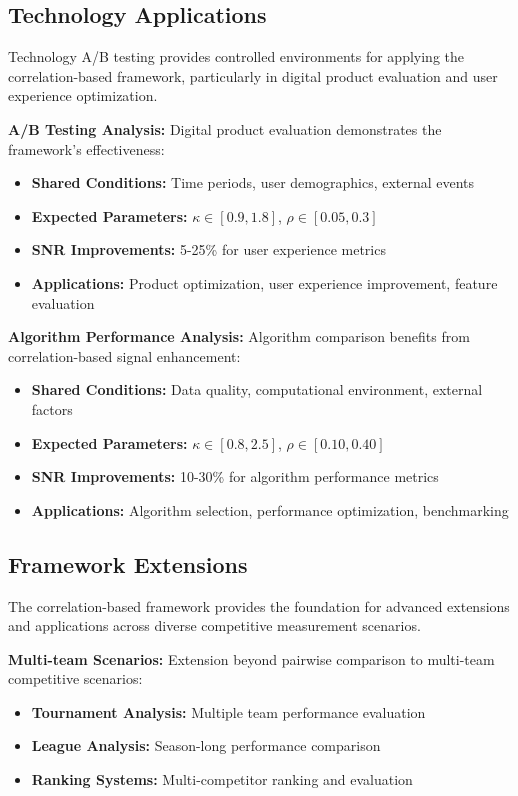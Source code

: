 \subsection{Technology Applications}

Technology A/B testing provides controlled environments for applying the correlation-based framework, particularly in digital product evaluation and user experience optimization.

\textbf{A/B Testing Analysis:}
Digital product evaluation demonstrates the framework's effectiveness:
\begin{itemize}
    \item \textbf{Shared Conditions:} Time periods, user demographics, external events
    \item \textbf{Expected Parameters:} $\kappa \in [0.9, 1.8]$, $\rho \in [0.05, 0.3]$
    \item \textbf{SNR Improvements:} 5-25\% for user experience metrics
    \item \textbf{Applications:} Product optimization, user experience improvement, feature evaluation
\end{itemize}

\textbf{Algorithm Performance Analysis:}
Algorithm comparison benefits from correlation-based signal enhancement:
\begin{itemize}
    \item \textbf{Shared Conditions:} Data quality, computational environment, external factors
    \item \textbf{Expected Parameters:} $\kappa \in [0.8, 2.5]$, $\rho \in [0.10, 0.40]$
    \item \textbf{SNR Improvements:} 10-30\% for algorithm performance metrics
    \item \textbf{Applications:} Algorithm selection, performance optimization, benchmarking
\end{itemize}

\subsection{Framework Extensions}

The correlation-based framework provides the foundation for advanced extensions and applications across diverse competitive measurement scenarios.

\textbf{Multi-team Scenarios:}
Extension beyond pairwise comparison to multi-team competitive scenarios:
\begin{itemize}
    \item \textbf{Tournament Analysis:} Multiple team performance evaluation
    \item \textbf{League Analysis:} Season-long performance comparison
    \item \textbf{Ranking Systems:} Multi-competitor ranking and evaluation
\end{itemize}

